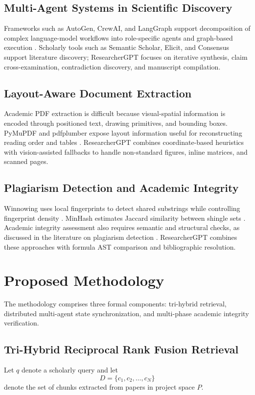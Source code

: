 \documentclass[conference]{IEEEtran}
\begin{document}
\subsection{Multi-Agent Systems in Scientific Discovery}
Frameworks such as AutoGen, CrewAI, and LangGraph support decomposition of complex language-model workflows into role-specific agents and graph-based execution \cite{wu2023autogen,moura2024crewai,langgraph2024}. Scholarly tools such as Semantic Scholar, Elicit, and Consensus support literature discovery; ResearcherGPT focuses on iterative synthesis, claim cross-examination, contradiction discovery, and manuscript compilation.
\subsection{Layout-Aware Document Extraction}
Academic PDF extraction is difficult because visual-spatial information is encoded through positioned text, drawing primitives, and bounding boxes. PyMuPDF and pdfplumber expose layout information useful for reconstructing reading order and tables \cite{singer2023pdfplumber}. ResearcherGPT combines coordinate-based heuristics with vision-assisted fallbacks to handle non-standard figures, inline matrices, and scanned pages.
\subsection{Plagiarism Detection and Academic Integrity}
Winnowing uses local fingerprints to detect shared substrings while controlling fingerprint density \cite{schleimer2003winnowing}. MinHash estimates Jaccard similarity between shingle sets \cite{broder1997resemblance}. Academic integrity assessment also requires semantic and structural checks, as discussed in the literature on plagiarism detection \cite{foltynek2019plagiarism}. ResearcherGPT combines these approaches with formula AST comparison and bibliographic resolution.
\section{Proposed Methodology}
The methodology comprises three formal components: tri-hybrid retrieval, distributed multi-agent state synchronization, and multi-phase academic integrity verification.
\subsection{Tri-Hybrid Reciprocal Rank Fusion Retrieval}
Let $q$ denote a scholarly query and let
\begin{equation}
D=\{c_1,c_2,\ldots,c_N\}
\label{eq:corpus}
\end{equation}
denote the set of chunks extracted from papers in project space $P$.
\end{document}
